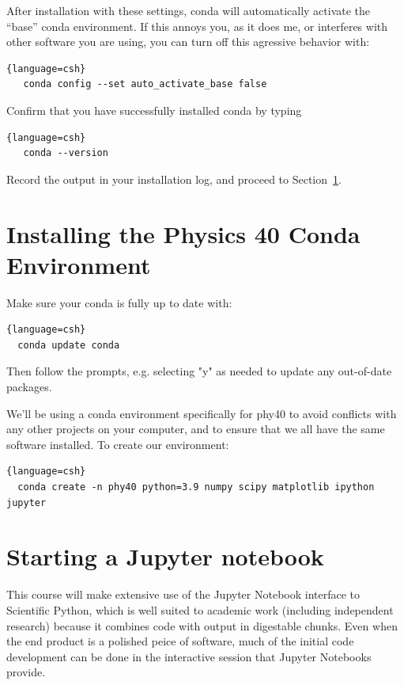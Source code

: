 After installation with these settings, conda will automatically
activate the ``base'' conda environment.  If this annoys you, as it
does me, or interferes with other software you are using, you can turn
off this agressive behavior with:
\begin{lstlisting}{language=csh}
   conda config --set auto_activate_base false
\end{lstlisting}

Confirm that you have successfully installed conda by typing
\begin{lstlisting}{language=csh}
   conda --version
\end{lstlisting}
Record the output in your installation log, and proceed to Section~\ref{sec:env}.

\section{Installing the Physics 40 Conda Environment}
\label{sec:env}

Make sure your conda is fully up to date with:
\begin{lstlisting}{language=csh}
  conda update conda
\end{lstlisting}
Then follow the prompts, e.g. selecting "y" as needed to update any out-of-date packages.

We'll be using a conda environment specifically for phy40 to avoid
conflicts with any other projects on your computer, and to ensure that
we all have the same software installed.  To create our environment:
\begin{lstlisting}{language=csh}
  conda create -n phy40 python=3.9 numpy scipy matplotlib ipython jupyter
\end{lstlisting}
  
\section{Starting a Jupyter notebook}

This course will make extensive use of the Jupyter Notebook interface
to Scientific Python, which is well suited to academic work (including
independent research) because it combines code with output in
digestable chunks.  Even when the end product is a polished peice of
software, much of the initial code development can be done in the interactive
session that Jupyter Notebooks provide.  

